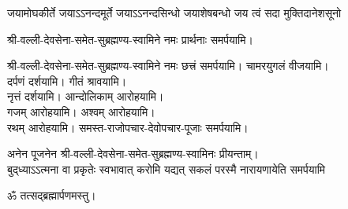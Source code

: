 {जयामोघकीर्ते जयाऽऽनन्दमूर्ते}
{जयाऽऽनन्दसिन्धो जयाशेषबन्धो}
{जय त्वं सदा मुक्तिदानेशसूनो}

श्री-वल्ली-देवसेना-समेत-सुब्रह्मण्य-स्वामिने नमः प्रार्थनाः समर्पयामि।

श्री-वल्ली-देवसेना-समेत-सुब्रह्मण्य-स्वामिने नमः छत्त्रं समर्पयामि।
चामरयुगलं वीजयामि।\\
दर्पणं दर्शयामि। गीतं श्रावयामि। \\
नृत्तं दर्शयामि। आन्दोलिकाम् आरोहयामि।\\
गजम् आरोहयामि। अश्वम् आरोहयामि।\\
रथम् आरोहयामि। समस्त-राजोपचार-देवोपचार-पूजाः समर्पयामि।


अनेन पूजनेन श्री-वल्ली-देवसेना-समेत-सुब्रह्मण्य-स्वामिनः प्रीयन्ताम्। \\


{बुद्‌ध्याऽऽत्मना वा प्रकृतेः स्वभावात्}
{करोमि यद्यत् सकलं परस्मै}
{नारायणायेति समर्पयामि}

ॐ तत्सद्ब्रह्मार्पणमस्तु।